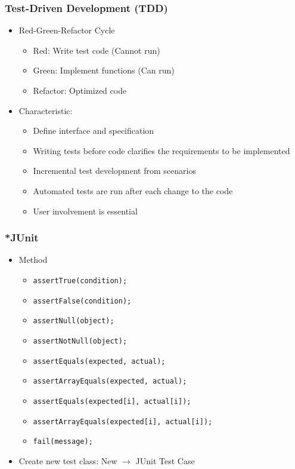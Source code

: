\documentclass[12pt,openany]{book}
\begin{document}
\subsubsection{Test-Driven Development (TDD)}
\begin{itemize}
    \item Red-Green-Refactor Cycle
    \begin{itemize}
        \item Red: Write test code (Cannot run)
        \item Green: Implement functions (Can run)
        \item Refactor: Optimized code
    \end{itemize}
    \item Characteristic:
    \begin{itemize}
        \item Define interface and specification
        \item Writing tests before code clarifies the requirements to be implemented
        \item Incremental test development from scenarios
        \item Automated tests are run after each change to the code
        \item User involvement is essential
    \end{itemize}
\end{itemize}

\subsubsection{*JUnit}
\begin{itemize}
    \item Method
    \begin{itemize}
        \item \texttt{assertTrue(condition);}
        \item \texttt{assertFalse(condition);}
        \item \texttt{assertNull(object);}
        \item \texttt{assertNotNull(object);}
        \item \texttt{assertEquals(expected, actual);}
        \item \texttt{assertArrayEquals(expected, actual);}
        \item \texttt{assertEquals(expected[i], actual[i]);}
        \item \texttt{assertArrayEquals(expected[i], actual[i]);}
        \item \texttt{fail(message);}
    \end{itemize}
    \item Create new test class: New $\rightarrow$ JUnit Test Case
\end{itemize}
\end{document}

